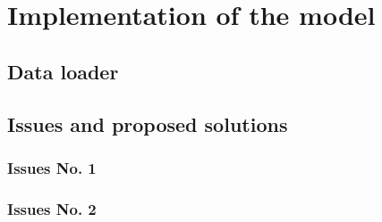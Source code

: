 
\chapter{Implementation of the model}\label{chapter:implementation_of_the_model}

\section{Data loader}
\section{Issues and proposed solutions}
\subsection{Issues No. 1}
\subsection{Issues No. 2}
